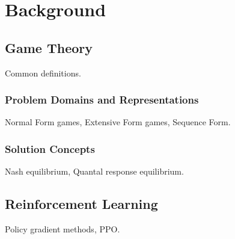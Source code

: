 \chapter{Background}

\section{Game Theory}
Common definitions.

\subsection{Problem Domains and Representations}
Normal Form games, Extensive Form games, Sequence Form.

\subsection{Solution Concepts}
Nash equilibrium, Quantal response equilibrium.

\section{Reinforcement Learning}
Policy gradient methods, PPO.
